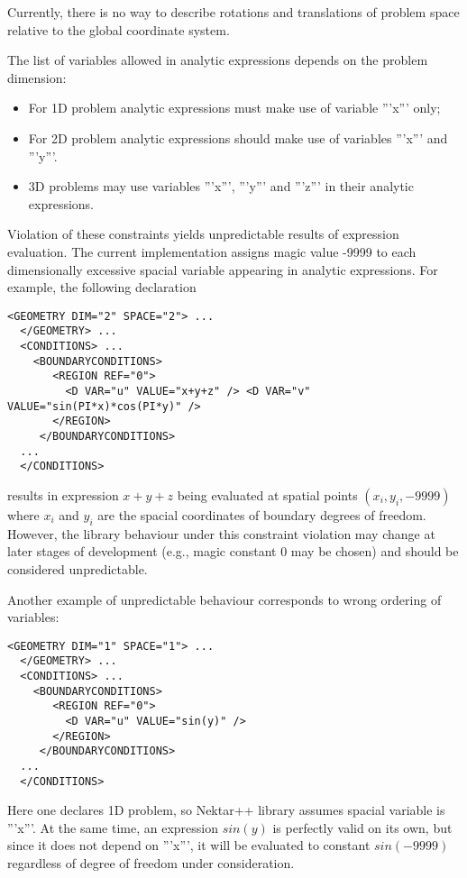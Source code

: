 Currently, there is no way to describe rotations and translations of problem
space relative to the global coordinate system.

The list of variables allowed in analytic expressions depends on the problem
dimension:
\begin{itemize}
\item For 1D problem analytic expressions must make use of variable '''x'''
only;
\item For 2D problem analytic expressions should make use of variables '''x'''
and '''y'''.
\item 3D problems may use variables '''x''', '''y''' and '''z''' in their
analytic expressions.
\end{itemize}

Violation of these constraints yields unpredictable results of expression
evaluation. The current implementation assigns magic value -9999 to each
dimensionally excessive spacial variable appearing in analytic expressions. For
example, the following declaration 
\begin{lstlisting}[style=XMLStyle]
  <GEOMETRY DIM="2" SPACE="2"> ...
  </GEOMETRY> ...
  <CONDITIONS> ...
    <BOUNDARYCONDITIONS>
       <REGION REF="0">
         <D VAR="u" VALUE="x+y+z" /> <D VAR="v" VALUE="sin(PI*x)*cos(PI*y)" />
       </REGION>
     </BOUNDARYCONDITIONS>
  ...
  </CONDITIONS>
\end{lstlisting}
results in expression $x+y+z$ being evaluated at spatial points
$(x_i,y_i, -9999)$ where $x_i$ and $y_i$ are
the spacial coordinates of boundary degrees of freedom. However, the library
behaviour under this constraint violation may change at later stages of
development (e.g., magic constant 0 may be chosen) and should be considered
unpredictable.

Another example of unpredictable behaviour corresponds to wrong ordering of
variables:
\begin{lstlisting}[style=XMLStyle]
  <GEOMETRY DIM="1" SPACE="1"> ...
  </GEOMETRY> ...
  <CONDITIONS> ...
    <BOUNDARYCONDITIONS>
       <REGION REF="0">
         <D VAR="u" VALUE="sin(y)" />
       </REGION>
     </BOUNDARYCONDITIONS>
  ...
  </CONDITIONS>
\end{lstlisting}
Here one declares 1D problem, so Nektar++ library assumes spacial variable
is '''x'''. At the same time, an expression $sin(y)$ is perfectly
valid on its own, but since it does not depend on '''x''', it will be evaluated
to constant $sin(-9999)$ regardless of degree of freedom under
consideration.


